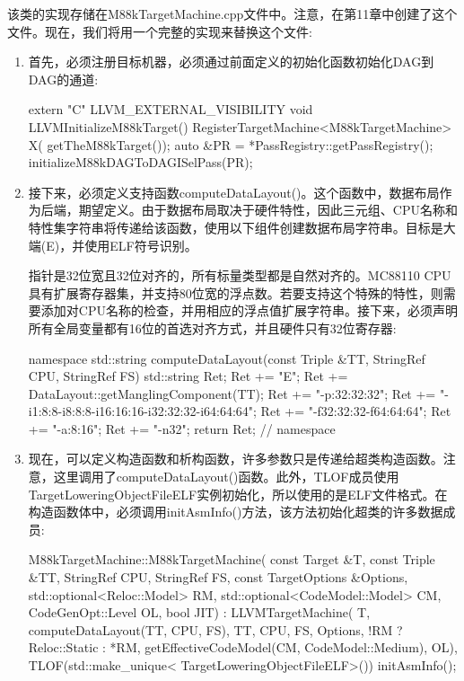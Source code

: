 
该类的实现存储在M88kTargetMachine.cpp文件中。注意，在第11章中创建了这个文件。现在，我们将用一个完整的实现来替换这个文件:

\begin{enumerate}
\item
首先，必须注册目标机器，必须通过前面定义的初始化函数初始化DAG到DAG的通道:

\begin{cpp}
extern "C" LLVM_EXTERNAL_VISIBILITY void
LLVMInitializeM88kTarget() {
    RegisterTargetMachine<M88kTargetMachine> X(
        getTheM88kTarget());
    auto &PR = *PassRegistry::getPassRegistry();
    initializeM88kDAGToDAGISelPass(PR);
}
\end{cpp}

\item
接下来，必须定义支持函数computeDataLayout()。这个函数中，数据布局作为后端，期望定义。由于数据布局取决于硬件特性，因此三元组、CPU名称和特性集字符串将传递给该函数，使用以下组件创建数据布局字符串。目标是大端(E)，并使用ELF符号识别。

指针是32位宽且32位对齐的，所有标量类型都是自然对齐的。MC88110 CPU具有扩展寄存器集，并支持80位宽的浮点数。若要支持这个特殊的特性，则需要添加对CPU名称的检查，并用相应的浮点值扩展字符串。接下来，必须声明所有全局变量都有16位的首选对齐方式，并且硬件只有32位寄存器:

\begin{cpp}
namespace {
std::string computeDataLayout(const Triple &TT,
                              StringRef CPU,
                              StringRef FS) {
    std::string Ret;
    Ret += "E";
    Ret += DataLayout::getManglingComponent(TT);
    Ret += "-p:32:32:32";
    Ret += "-i1:8:8-i8:8:8-i16:16:16-i32:32:32-i64:64:64";
    Ret += "-f32:32:32-f64:64:64";
    Ret += "-a:8:16";
    Ret += "-n32";
    return Ret;
}
} // namespace
\end{cpp}

\item
现在，可以定义构造函数和析构函数，许多参数只是传递给超类构造函数。注意，这里调用了computeDataLayout()函数。此外，TLOF成员使用TargetLoweringObjectFileELF实例初始化，所以使用的是ELF文件格式。在构造函数体中，必须调用initAsmInfo()方法，该方法初始化超类的许多数据成员:

\begin{cpp}
M88kTargetMachine::M88kTargetMachine(
    const Target &T, const Triple &TT, StringRef CPU,
    StringRef FS, const TargetOptions &Options,
    std::optional<Reloc::Model> RM,
    std::optional<CodeModel::Model> CM,
    CodeGenOpt::Level OL, bool JIT)
    : LLVMTargetMachine(
        T, computeDataLayout(TT, CPU, FS), TT, CPU,
        FS, Options, !RM ? Reloc::Static : *RM,
        getEffectiveCodeModel(CM, CodeModel::Medium),
        OL),
    TLOF(std::make_unique<
        TargetLoweringObjectFileELF>()) {
    initAsmInfo();
}


\end{cpp}
\end{enumerate}
